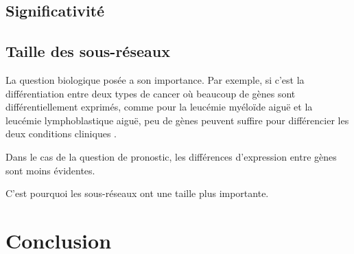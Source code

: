     \subsection{\textcolor{myblue}{Significativité}}
      \citep{Fan2006}
      \citep{Haibe-Kains2008}

    \subsection{\textcolor{myblue}{Taille des sous-réseaux}}
    La question biologique posée a son importance.
    Par exemple, si c'est la différentiation entre deux types de cancer où beaucoup de gènes sont différentiellement exprimés, comme pour la leucémie myéloïde aiguë et la leucémie lymphoblastique aiguë, peu de gènes peuvent suffire pour différencier les deux conditions cliniques \citep{Dobbin2008}.

    Dans le cas de la question de pronostic, les différences d'expression entre gènes sont moins évidentes.

    C'est pourquoi les sous-réseaux ont une taille plus importante.

  \section{\textcolor{myblue}{Conclusion}}
  